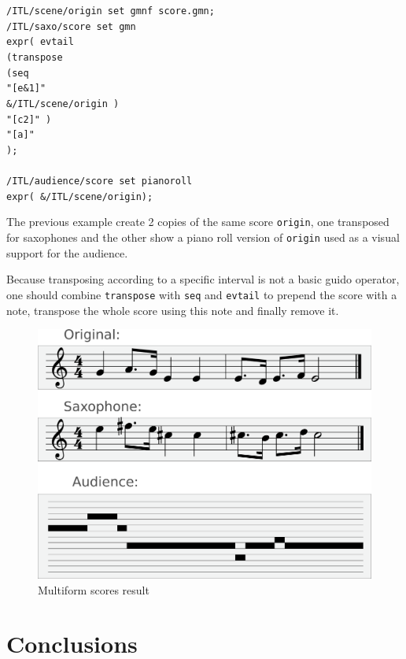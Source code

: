 \documentclass{article}
\newcommand{\OSC}[1]{\texttt{#1}}
\newcommand{\tab}{\hspace*{4mm}}
\newcommand{\sample}	[1]			{\vspace{-0.2em}\begin{center}\colorbox{mygrey}{\begin{minipage}[t]{0.95\columnwidth} {\small \texttt{#1}}\end{minipage}}\end{center}}
\begin{document}
\sample{/ITL/scene/origin set gmnf score.gmn;\\
/ITL/saxo/score set gmn \\
\tab expr( evtail\\
\tab \tab (transpose\\
\tab \tab \tab (seq\\
\tab \tab \tab \tab "[e\&1]"\\
\tab \tab \tab \tab \&/ITL/scene/origin )\\
\tab \tab \tab "[c2]" )\\
\tab \tab "[a]"\\
\tab );\\
\\
/ITL/audience/score set pianoroll \\
\tab expr( \&/ITL/scene/origin);
}

The previous example create 2 copies of the same score \OSC{origin}, one transposed for saxophones and the other show a piano roll version of \OSC{origin} used as a visual support for the audience.

Because transposing according to a specific interval is not a basic guido operator, one should combine \OSC{transpose} with \OSC{seq} and \OSC{evtail} to prepend the score with a note, transpose the whole score using this note and finally remove it.

\begin{figure}[th]
\centering
\includegraphics[width=0.9\columnwidth]{imgs/example1}
\caption{Multiform scores result
\label{fig:expandingTree}}
\end{figure}

\section{Conclusions}
\end{document}
